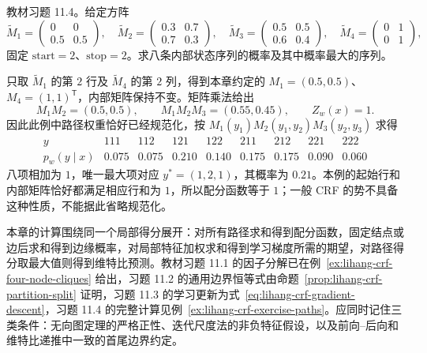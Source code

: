 \begin{example}
\label{ex:lihang-crf-exercise-paths}
教材习题 11.4。给定方阵
\[
  \widetilde M_1=\begin{pmatrix}0&0\\0.5&0.5\end{pmatrix},\quad
  \widetilde M_2=\begin{pmatrix}0.3&0.7\\0.7&0.3\end{pmatrix},\quad
  \widetilde M_3=\begin{pmatrix}0.5&0.5\\0.6&0.4\end{pmatrix},\quad
  \widetilde M_4=\begin{pmatrix}0&1\\0&1\end{pmatrix},
\]
固定 $\mathrm{start}=2$、$\mathrm{stop}=2$。求八条内部状态序列的概率及其中概率最大的序列。
\end{example}
\begin{solve}
只取 $\widetilde M_1$ 的第 $2$ 行及 $\widetilde M_4$ 的第 $2$ 列，得到本章约定的 $M_1=(0.5,0.5)$、$M_4=(1,1)^{\mathsf T}$，内部矩阵保持不变。矩阵乘法给出
\[
  M_1M_2=(0.5,0.5),\qquad
  M_1M_2M_3=(0.55,0.45),\qquad Z_w(x)=1.
\]
因此此例中路径权重恰好已经规范化，按 $M_1(y_1)M_2(y_1,y_2)M_3(y_2,y_3)$ 求得
\[
\begin{array}{c|rrrrrrrr}
 y&111&112&121&122&211&212&221&222\\\hline
 p_w(y\mid x)&0.075&0.075&0.210&0.140&0.175&0.175&0.090&0.060
\end{array}
\]
八项相加为 $1$，唯一最大项对应 $y^*=(1,2,1)$，其概率为 $0.21$。本例的起始行和内部矩阵恰好都满足相应行和为 $1$，所以配分函数等于 $1$；一般 CRF 的势不具备这种性质，不能据此省略规范化。
\end{solve}

本章的计算围绕同一个局部得分展开：对所有路径求和得到配分函数，固定结点或边后求和得到边缘概率，对局部特征加权求和得到学习梯度所需的期望，对路径得分取最大值则得到维特比预测。教材习题 11.1 的因子分解已在例~\ref{ex:lihang-crf-four-node-cliques} 给出，习题 11.2 的通用边界恒等式由命题~\ref{prop:lihang-crf-partition-split} 证明，习题 11.3 的学习更新为式~\eqref{eq:lihang-crf-gradient-descent}，习题 11.4 的完整计算见例~\ref{ex:lihang-crf-exercise-paths}。应同时记住三类条件：无向图定理的严格正性、迭代尺度法的非负特征假设，以及前向--后向和维特比递推中一致的首尾边界约定。





